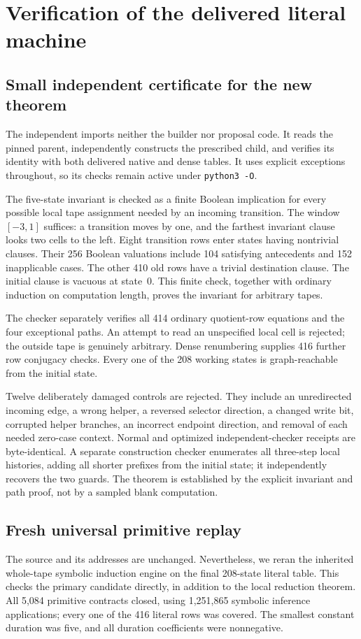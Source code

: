 \section{Verification of the delivered literal machine}
\label{sec:verification}
\subsection{Small independent certificate for the new theorem}
The independent  imports neither the builder
nor proposal code. It reads the pinned parent, independently constructs
the prescribed child, and verifies its identity with both delivered
native and dense tables. It uses explicit exceptions throughout, so its
checks remain active under \texttt{python3 -O}.

The five-state invariant is checked as a finite Boolean implication for
every possible local tape assignment needed by an incoming transition.
The window $[-3,1]$ suffices: a transition moves by one, and the farthest
invariant clause looks two cells to the left. Eight transition rows
enter states having nontrivial clauses. Their 256 Boolean valuations
include 104 satisfying antecedents and 152 inapplicable cases. The other
410 old rows have a trivial destination clause. The initial clause is
vacuous at state~0. This finite check, together with ordinary induction
on computation length, proves the invariant for arbitrary tapes.

The checker separately verifies all 414 ordinary quotient-row equations
and the four exceptional paths. An attempt to read an unspecified local
cell is rejected; the outside tape is genuinely arbitrary. Dense
renumbering supplies 416 further row conjugacy checks. Every one of the
208 working states is graph-reachable from the initial state.

Twelve deliberately damaged controls are rejected. They include an
unredirected incoming edge, a wrong helper, a reversed selector direction,
a changed write bit, corrupted helper branches, an incorrect endpoint
direction, and removal of each needed zero-case context. Normal and
optimized independent-checker receipts are byte-identical. A separate
construction checker enumerates all three-step local histories, adding
all shorter prefixes from the initial state; it independently recovers
the two guards. The theorem is established by the explicit invariant
and path proof, not by a sampled blank computation.

\subsection{Fresh universal primitive replay}
The source and its addresses are unchanged. Nevertheless, we reran the
inherited whole-tape symbolic induction engine on the final 208-state
literal table. This checks the primary candidate directly, in addition
to the local reduction theorem. All 5,084 primitive contracts closed,
using 1,251,865 symbolic inference applications; every one of the 416
literal rows was covered. The smallest constant duration was five, and
all duration coefficients were nonnegative.

